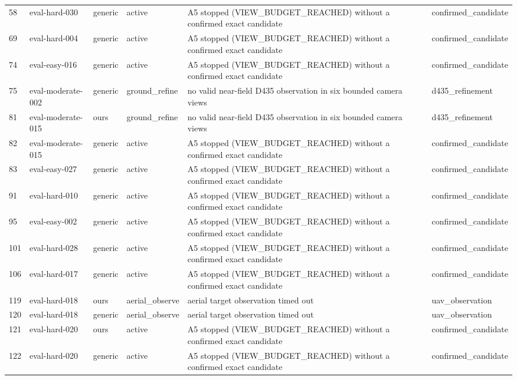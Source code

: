 \begin{tabular}{llllll}
58 & eval-hard-030 & generic & active & A5 stopped (VIEW\_BUDGET\_REACHED) without a confirmed exact candidate & confirmed\_candidate \\
69 & eval-hard-004 & generic & active & A5 stopped (VIEW\_BUDGET\_REACHED) without a confirmed exact candidate & confirmed\_candidate \\
74 & eval-easy-016 & generic & active & A5 stopped (VIEW\_BUDGET\_REACHED) without a confirmed exact candidate & confirmed\_candidate \\
75 & eval-moderate-002 & generic & ground\_refine & no valid near-field D435 observation in six bounded camera views & d435\_refinement \\
81 & eval-moderate-015 & ours & ground\_refine & no valid near-field D435 observation in six bounded camera views & d435\_refinement \\
82 & eval-moderate-015 & generic & active & A5 stopped (VIEW\_BUDGET\_REACHED) without a confirmed exact candidate & confirmed\_candidate \\
83 & eval-easy-027 & generic & active & A5 stopped (VIEW\_BUDGET\_REACHED) without a confirmed exact candidate & confirmed\_candidate \\
91 & eval-hard-010 & generic & active & A5 stopped (VIEW\_BUDGET\_REACHED) without a confirmed exact candidate & confirmed\_candidate \\
95 & eval-easy-002 & generic & active & A5 stopped (VIEW\_BUDGET\_REACHED) without a confirmed exact candidate & confirmed\_candidate \\
101 & eval-hard-028 & generic & active & A5 stopped (VIEW\_BUDGET\_REACHED) without a confirmed exact candidate & confirmed\_candidate \\
106 & eval-hard-017 & generic & active & A5 stopped (VIEW\_BUDGET\_REACHED) without a confirmed exact candidate & confirmed\_candidate \\
119 & eval-hard-018 & ours & aerial\_observe & aerial target observation timed out & uav\_observation \\
120 & eval-hard-018 & generic & aerial\_observe & aerial target observation timed out & uav\_observation \\
121 & eval-hard-020 & ours & active & A5 stopped (VIEW\_BUDGET\_REACHED) without a confirmed exact candidate & confirmed\_candidate \\
122 & eval-hard-020 & generic & active & A5 stopped (VIEW\_BUDGET\_REACHED) without a confirmed exact candidate & confirmed\_candidate \\

\end{tabular}
